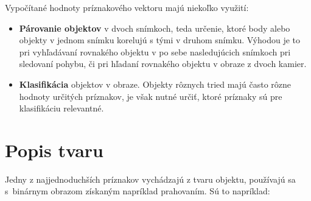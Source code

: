     Vypočítané hodnoty príznakového vektoru majú niekoľko využití:

    \begin{itemize}
        \item \textbf{Párovanie objektov} v dvoch snímkoch, teda určenie, ktoré body alebo objekty v jednom snímku korelujú s tými v druhom snímku. Výhodou je to pri vyhľadávaní rovnakého objektu v po sebe nasledujúcich snímkoch pri sledovaní pohybu, či pri hľadaní rovnakého objektu v obraze z dvoch kamier.
        \item \textbf{Klasifikácia} objektov v obraze. Objekty rôznych tried majú často rôzne hodnoty určitých príznakov, je však nutné určiť, ktoré príznaky sú pre klasifikáciu relevantné.
    \end{itemize}

    \section{Popis tvaru}

        Jedny z najjednoduchších príznakov vychádzajú z tvaru objektu, používajú sa s~binárnym obrazom získaným napríklad prahovaním. \cite{Morse1998/2} Sú to napríklad:

